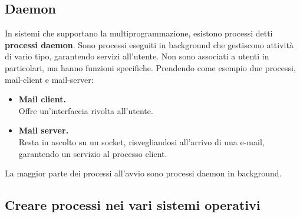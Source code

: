 \documentclass{report}
\begin{document}
\subsection{Daemon}
In sistemi che supportano la multiprogrammazione, esistono processi detti \textbf{processi daemon}. Sono processi eseguiti in background che gestiscono attività di vario tipo, garantendo servizi all'utente. Non sono associati a utenti in particolari, ma hanno funzioni specifiche. Prendendo come esempio due processi, mail-client e mail-server:
\begin{itemize}
    \item \textbf{Mail client.}\\
    Offre un'interfaccia rivolta all'utente.
    \item \textbf{Mail server.}\\
    Resta in ascolto su un socket, risvegliandosi all'arrivo di una e-mail, garantendo un servizio al processo client.
\end{itemize}

La maggior parte dei processi all'avvio sono processi daemon in background.

\newpage

\subsection{Creare processi nei vari sistemi operativi}
\end{document}
